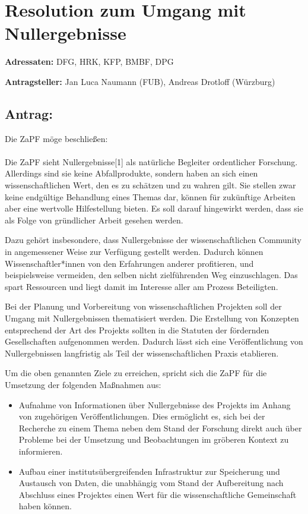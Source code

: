 \documentclass[DIV=12]{scrartcl}
\begin{document}
\section*{Resolution zum Umgang mit Nullergebnisse}

\textbf{Adressaten:} DFG, HRK, KFP, BMBF, DPG

\textbf{Antragsteller:} Jan Luca Naumann (FUB), Andreas Drotloff (Würzburg)

\subsection*{Antrag:}
Die ZaPF möge beschließen:\\\\

Die ZaPF sieht Nullergebnisse[1] als natürliche Begleiter ordentlicher Forschung. Allerdings sind sie keine Abfallprodukte, sondern haben an sich einen wissenschaftlichen Wert, den es zu schätzen und zu wahren gilt. Sie stellen zwar keine endgültige Behandlung eines Themas dar, können für zukünftige Arbeiten aber eine wertvolle Hilfestellung bieten. Es soll darauf hingewirkt werden, dass sie als Folge von gründlicher Arbeit gesehen werden.

Dazu gehört insbesondere, dass Nullergebnisse der wissenschaftlichen Community in angemessener Weise zur Verfügung gestellt werden. Dadurch können Wissenschaftler*innen von den Erfahrungen anderer profitieren, und beispielsweise vermeiden, den selben nicht zielführenden Weg einzuschlagen. Das spart Ressourcen und liegt damit im Interesse aller am Prozess Beteiligten.

Bei der Planung und Vorbereitung von wissenschaftlichen Projekten soll der Umgang mit Nullergebnissen thematisiert werden. Die Erstellung von Konzepten entsprechend der Art des Projekts sollten in die Statuten der fördernden Gesellschaften aufgenommen werden. Dadurch lässt sich eine Veröffentlichung von Nullergebnissen langfristig als Teil der wissenschaftlichen Praxis etablieren.  

Um die oben genannten Ziele zu erreichen, spricht sich die ZaPF für die Umsetzung der folgenden Maßnahmen aus:

\begin{itemize}
\item Aufnahme von Informationen über Nullergebnisse des Projekts im Anhang von zugehörigen Veröffentlichungen. Dies ermöglicht es, sich bei der Recherche zu einem Thema neben dem Stand der Forschung direkt auch über Probleme bei der Umsetzung und Beobachtungen im gröberen Kontext zu informieren.
\item Aufbau einer institutsübergreifenden Infrastruktur zur Speicherung und Austausch von Daten, die unabhängig vom Stand der Aufbereitung nach Abschluss eines Projektes einen Wert für die wissenschaftliche Gemeinschaft haben können.
\end{itemize}
~\\\\
\end{document}
